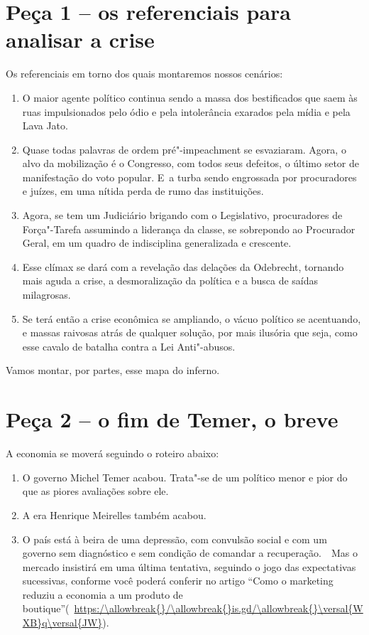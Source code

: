  

\section{Peça 1 -- os referenciais para analisar a crise}

Os referenciais em torno dos quais montaremos nossos cenários:

\begin{enumerate}
\itemsep1pt\parskip0pt
\item
  O maior agente político continua sendo a massa dos bestificados que
  saem às ruas impulsionados pelo ódio e pela intolerância exarados pela
  mídia e pela Lava Jato.
\item
  Quase todas palavras de ordem pré"-impeachment se esvaziaram. Agora, o
  alvo da mobilização é o Congresso, com todos seus defeitos, o último
  setor de manifestação do voto popular. E~a turba sendo engrossada por
  procuradores e juízes, em uma nítida perda de rumo das instituições.
\item
  Agora, se tem um Judiciário brigando com o Legislativo, procuradores
  de Força"-Tarefa assumindo a liderança da classe, se sobrepondo ao
  Procurador Geral, em um quadro de indisciplina generalizada e
  crescente.
\item
  Esse clímax se dará com a revelação das delações da Odebrecht,
  tornando mais aguda a crise, a desmoralização da política e a busca de
  saídas milagrosas.
\item
  Se terá então a crise econômica se ampliando, o vácuo político se
  acentuando, e massas raivosas atrás de qualquer solução, por mais
  ilusória que seja, como esse cavalo de batalha contra a Lei
  Anti"-abusos.
\end{enumerate}

Vamos montar, por partes, esse mapa do inferno.

\section{Peça 2 -- o fim de Temer, o breve}

A economia se moverá seguindo o roteiro abaixo:

\begin{enumerate}
\itemsep1pt\parskip0pt
\item
  O governo Michel Temer acabou. Trata"-se de um político menor e pior do
  que as piores avaliações sobre ele.
\item
  A era Henrique Meirelles também acabou.
\item
  O país está à beira de uma depressão, com convulsão social e com um
  governo sem diagnóstico e sem condição de comandar a recuperação.~~Mas
  o mercado insistirá em uma última tentativa, seguindo o jogo das
  expectativas sucessivas, conforme você poderá conferir no artigo
  ``Como o marketing reduziu a economia a um produto de
  boutique''(~\url{https:/\allowbreak{}/\allowbreak{}is.gd/\allowbreak{}\versal{WXB}q\versal{JW}}).
\end{enumerate}

